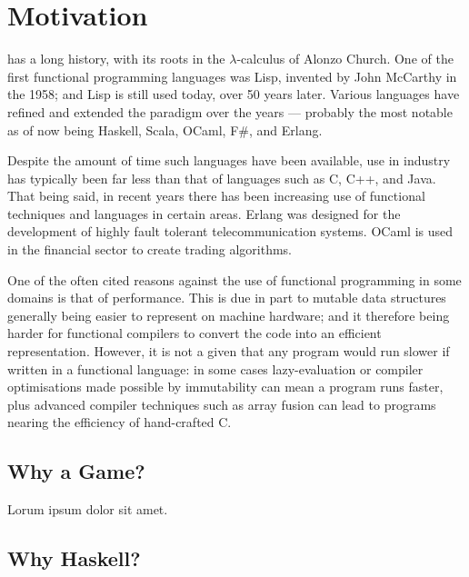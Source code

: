 \chapter[Motivation]{Motivation}
\label{ch:motivation}


 has a long history, with its roots in the $\lambda$-calculus of Alonzo Church. One of the first functional programming languages was Lisp, invented by John McCarthy in the 1958; and Lisp is still used today, over 50 years later. Various languages have refined and extended the paradigm over the years --- probably the most notable as of now being Haskell, Scala, OCaml, F\#, and Erlang.

Despite the amount of time such languages have been available, use in industry has typically been far less than that of languages such as C, C++, and Java. That being said, in recent years there has been increasing use of functional techniques and languages in certain areas. Erlang was designed for the development of highly fault tolerant telecommunication systems.\cite[-1em]{armstrong2007history} OCaml is used in the financial sector to create trading algorithms.

One of the often cited reasons against the use of functional programming in some domains is that of performance. This is due in part to mutable data structures generally being easier to represent on machine hardware; and it therefore being harder for functional compilers to convert the code into an efficient representation. However, it is not a given that any program would run slower if written in a functional language: in some cases lazy-evaluation or compiler optimisations made possible by immutability can mean a program runs faster, plus advanced compiler techniques such as array fusion can lead to programs nearing the efficiency of hand-crafted C. 



\section{Why a Game?}

Lorum ipsum dolor sit amet.

\section{Why Haskell?}